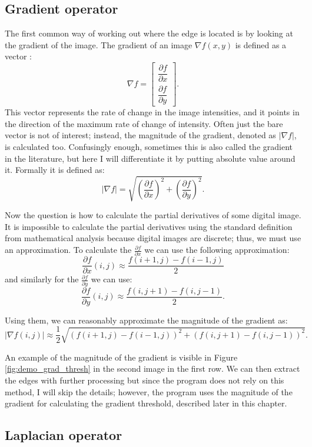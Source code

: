 \documentclass[
  digital,     %
  oneside,     %
  nosansbold,  %
  nocolorbold, %
  lof,         %
  lot,         %
]{fithesis4}
\begin{document}
\subsection{Gradient operator}

The first common way of working out where the edge is located is by looking at
the gradient of the image. The gradient of an image $\nabla f(x,y)$ is defined
as a vector \cite{gonzalez2002}:
$$\nabla f =
\begin{bmatrix}
    \dfrac{\partial f}{\partial x}\\[2ex]
    \dfrac{\partial f}{\partial y}
\end{bmatrix}.$$
This vector represents the rate of change in the image intensities, and it points in
the direction of the maximum rate of change of intensity. Often just the bare
vector is not of interest; instead, the magnitude of the gradient, denoted as
$|\nabla f|$, is calculated too. Confusingly enough, sometimes this is also called
the gradient in the literature, but here I will differentiate it by putting
absolute value around it. Formally it is defined as:
$$|\nabla f| = \sqrt{\left(\frac{\partial f}{\partial x}\right)^2 +
\left(\frac{\partial f}{\partial y}\right)^2}.$$

Now the question is how to calculate the partial derivatives of some digital image.
It is impossible to calculate the partial derivatives using the standard
definition from mathematical analysis because digital images are discrete; thus,
we must use an approximation. To calculate the $\frac{\partial f}{\partial x}$
we can use the following approximation:
$$\frac{\partial f}{\partial x}(i, j) \approx \frac{f(i+1,j)-f(i-1,j)}{2}$$
and similarly for the $\frac{\partial f}{\partial y}$ we can use:
$$\frac{\partial f}{\partial y}(i, j) \approx \frac{f(i, j+1)-f(i,j-1)}{2}.$$

Using them, we can reasonably approximate the magnitude of the gradient as:
$$|\nabla f(i, j)| \approx \frac{1}{2}\sqrt{(f(i+1, j) - f(i-1, j))^2 + (f(i, j+1) - f(i, j-1))^2}.$$

An example of the magnitude of the gradient is visible in Figure
\ref{fig:demo_grad_thresh} in the second image in the first row.
We can then extract the edges with further processing but since the program
does not rely on this method, I will skip the details; however, the program uses
the magnitude of the gradient for calculating the gradient threshold, described later
in this chapter.

\subsection{Laplacian operator}
\end{document}
